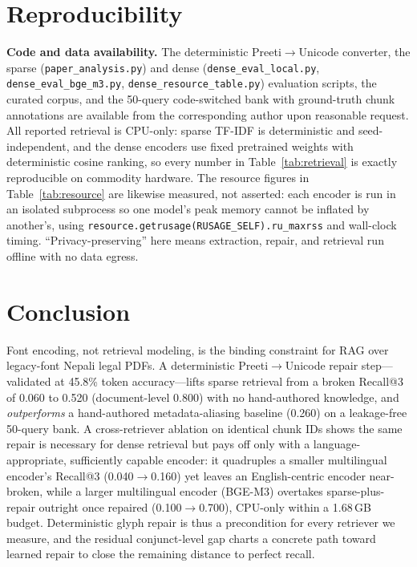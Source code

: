 \documentclass[journal]{IEEEtran}
\newcommand{\nqueries}{50}
\newcommand{\rawRecall}{0.060}
\newcommand{\repRecall}{0.520}
\newcommand{\repDocRecall}{0.800}
\newcommand{\aliRecall}{0.260}
\newcommand{\repairValidity}{45.8}
\newcommand{\denseMlRawRecall}{0.040}
\newcommand{\denseMlRepRecall}{0.160}
\newcommand{\denseBgeRawRecall}{0.100}
\newcommand{\denseBgeRepRecall}{0.700}
\newcommand{\densePeakRSS}{1.68}
\begin{document}
\section{Reproducibility}
\textbf{Code and data availability.} The deterministic Preeti$\rightarrow$Unicode converter, the sparse (\texttt{paper\_analysis.py}) and dense (\texttt{dense\_eval\_local.py}, \texttt{dense\_eval\_bge\_m3.py}, \texttt{dense\_resource\_table.py}) evaluation scripts, the curated corpus, and the \nqueries{}-query code-switched bank with ground-truth chunk annotations are available from the corresponding author upon reasonable request. All reported retrieval is CPU-only: sparse TF-IDF is deterministic and seed-independent, and the dense encoders use fixed pretrained weights with deterministic cosine ranking, so every number in Table~\ref{tab:retrieval} is exactly reproducible on commodity hardware. The resource figures in Table~\ref{tab:resource} are likewise measured, not asserted: each encoder is run in an isolated subprocess so one model's peak memory cannot be inflated by another's, using \texttt{resource.getrusage(RUSAGE\_SELF).ru\_maxrss} and wall-clock timing. ``Privacy-preserving'' here means extraction, repair, and retrieval run offline with no data egress.

\section{Conclusion}
Font encoding, not retrieval modeling, is the binding constraint for RAG over legacy-font Nepali legal PDFs. A deterministic Preeti$\rightarrow$Unicode repair step---validated at \repairValidity{}\% token accuracy---lifts sparse retrieval from a broken Recall@3 of \rawRecall{} to \repRecall{} (document-level \repDocRecall{}) with no hand-authored knowledge, and \emph{outperforms} a hand-authored metadata-aliasing baseline (\aliRecall{}) on a leakage-free \nqueries{}-query bank. A cross-retriever ablation on identical chunk IDs shows the same repair is necessary for dense retrieval but pays off only with a language-appropriate, sufficiently capable encoder: it quadruples a smaller multilingual encoder's Recall@3 (\denseMlRawRecall{}$\rightarrow$\denseMlRepRecall{}) yet leaves an English-centric encoder near-broken, while a larger multilingual encoder (BGE-M3) overtakes sparse-plus-repair outright once repaired (\denseBgeRawRecall{}$\rightarrow$\denseBgeRepRecall{}), CPU-only within a \densePeakRSS{}\,GB budget. Deterministic glyph repair is thus a precondition for every retriever we measure, and the residual conjunct-level gap charts a concrete path toward learned repair to close the remaining distance to perfect recall.
\end{document}
